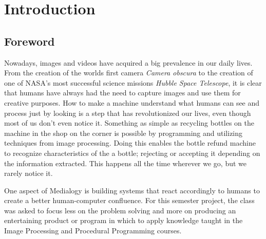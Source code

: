 \chapter{Introduction}
\section{Foreword}
Nowadays, images and videos have acquired a big prevalence in our daily lives. From the creation of the worlds first camera \textit{Camera obscura} to the creation of one of NASA's most successful science missions \textit{Hubble Space Telescope}, it is clear that humans have always had the need to capture images and use them for creative purposes. How to make a machine understand what humans can see and process just by looking is a step that has revolutionized our lives, even though most of us don't even notice it. Something as simple as recycling bottles on the machine in the shop on the corner is possible by programming and utilizing techniques from image processing. Doing this enables the bottle refund machine to recognize characteristics of the a bottle; rejecting or accepting it depending on the information extracted. This happens all the time wherever we go, but we rarely notice it.

One aspect of Medialogy is building systems that react accordingly to humans to create a better human-computer confluence. For this semester project, the class was asked to focus less on the problem solving and more on producing an entertaining product or program in which to apply knowledge taught in the Image Processing and Procedural Programming courses.




